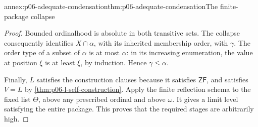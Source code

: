 \begin{annexitem}{annex:p06-adequate-condensation}{thm:p06-adequate-condensation}{The finite-package collapse}
\begin{proof}
Bounded ordinalhood is absolute in both transitive sets.
The collapse consequently identifies \(X\cap\alpha\),
with its inherited membership order, with \(\gamma\).
The order type of a subset of \(\alpha\) is at most
\(\alpha\): in its increasing enumeration, the value
at position \(\xi\) is at least \(\xi\), by induction.
Hence \(\gamma\leq\alpha\).

Finally, \(L\) satisfies the construction clauses because
it satisfies \(\mathsf{ZF}\), and satisfies \(V=L\) by
\cref{thm:p06-l-self-construction}.
Apply the finite reflection schema to the fixed list
\(\Theta\), above any prescribed ordinal and above \(\omega\).
It gives a limit level satisfying the entire package.
This proves that the required stages are arbitrarily high.
\end{proof}
\end{annexitem}

